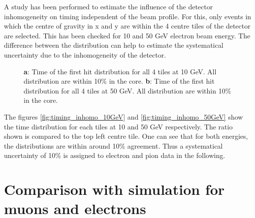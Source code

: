 \documentclass[twoside,a4paper,11pt]{article}
\begin{document}
A study has been performed to estimate the influence of the detector inhomogeneity on timing independent of the beam profile. For this, only events in which the centre of gravity in x and y are within the 4 centre tiles of the detector are selected. This has been checked for 10 and 50 GeV electron beam energy. The difference between the distribution can help to estimate the systematical uncertainty due to the inhomogeneity of the detector. 
\begin{figure}[htbp]
	\hfill
	\caption[]{\textbf{a}: Time of the first hit distribution for all 4 tiles at 10 GeV. All distribution are within 10\% in the core. \textbf{b}: Time of the first hit distribution for all 4 tiles at 50 GeV. All distribution are within 10\% in the core.}
\end{figure}
The figures \ref{fig:timing_inhomo_10GeV} and \ref{fig:timing_inhomo_50GeV} show the time distribution for each tiles at 10 and 50 GeV respectively. The ratio shown is compared to the top left centre tile. One can see that for both energies, the distributions are within around 10\% agreement. Thus a systematical uncertainty of 10\% is assigned to electron and pion data in the following.

\section{Comparison with simulation for muons and electrons}
\end{document}
